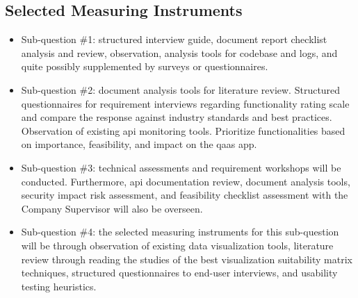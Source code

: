 \begin{itemize}[label=-]
\end{itemize}
\subsection{Selected Measuring Instruments}
\begin{itemize}[label=-]
      \item Sub-question \#1: structured interview guide, document report checklist analysis and review,
            observation, analysis tools for codebase and logs, and quite possibly supplemented by surveys
            or questionnaires.
      \item Sub-question \#2: document analysis tools for literature review. Structured questionnaires for
            requirement interviews regarding functionality rating scale and compare the response against
            industry standards and best practices. Observation of existing \acrshort{api} monitoring tools.
            Prioritize functionalities based on importance, feasibility, and impact on the \acrshort{qaas} app.
      \item Sub-question \#3: technical assessments and requirement workshops will be conducted. Furthermore,
            \acrshort{api} documentation  review, document analysis tools, security impact risk assessment,
            and feasibility checklist assessment with the Company Supervisor will also be overseen.
      \item Sub-question \#4: the selected measuring instruments for this sub-question will be through
            observation of existing data visualization tools, literature review through reading the studies of
            the best visualization suitability matrix techniques, structured questionnaires to end-user
            interviews, and usability testing heuristics.
\end{itemize}
